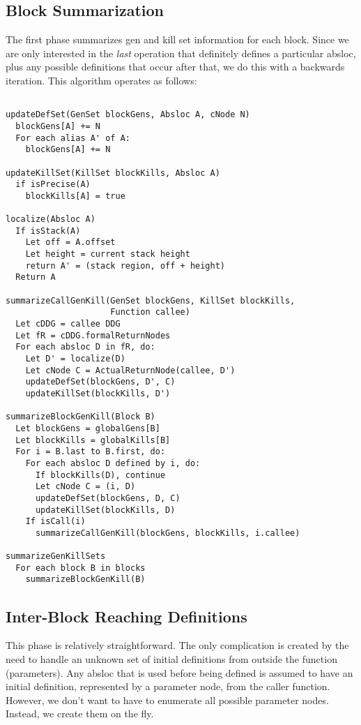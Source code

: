 \documentclass[11pt]{article}
\begin{document}
\subsection*{Block Summarization}

The first phase summarizes gen and kill set information for each
block. Since we are only interested in the \emph{last} operation that
definitely defines a particular absloc, plus any possible definitions
that occur after that, we do this with a backwards iteration. This
algorithm operates as follows:

\begin{verbatim}

updateDefSet(GenSet blockGens, Absloc A, cNode N)
  blockGens[A] += N
  For each alias A' of A:
    blockGens[A] += N

updateKillSet(KillSet blockKills, Absloc A) 
  if isPrecise(A)
    blockKills[A] = true

localize(Absloc A)
  If isStack(A)
    Let off = A.offset
    Let height = current stack height
    return A' = (stack region, off + height)
  Return A

summarizeCallGenKill(GenSet blockGens, KillSet blockKills,
                     Function callee) 
  Let cDDG = callee DDG
  Let fR = cDDG.formalReturnNodes
  For each absloc D in fR, do:
    Let D' = localize(D)
    Let cNode C = ActualReturnNode(callee, D')
    updateDefSet(blockGens, D', C)
    updateKillSet(blockKills, D')

summarizeBlockGenKill(Block B)
  Let blockGens = globalGens[B]
  Let blockKills = globalKills[B]
  For i = B.last to B.first, do: 
    For each absloc D defined by i, do:
      If blockKills(D), continue       
      Let cNode C = (i, D)
      updateDefSet(blockGens, D, C)
      updateKillSet(blockKills, D)
    If isCall(i)
      summarizeCallGenKill(blockGens, blockKills, i.callee)

summarizeGenKillSets
  For each block B in blocks
    summarizeBlockGenKill(B)

\end{verbatim}
                
\subsection*{Inter-Block Reaching Definitions}

This phase is relatively straightforward. The only complication is
created by the need to handle an unknown set of initial definitions
from outside the function (parameters). Any absloc that is used before
being defined is assumed to have an initial definition, represented by
a parameter node, from the caller function. However, we don't want to
have to enumerate all possible parameter nodes. Instead, we create
them on the fly. 
\end{document}
